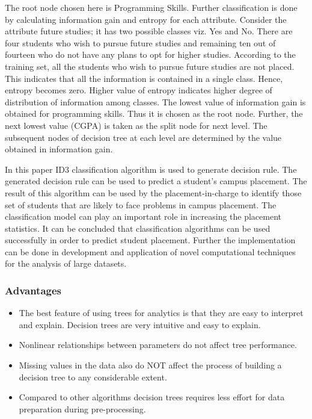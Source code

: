 \documentclass[12pt]{article}
\begin{document}
The root node chosen here is Programming Skills. 
Further classification is done by calculating information 
gain and entropy for each attribute. Consider the attribute future studies; it has two possible 
classes viz. Yes and No. There are four students who wish 
to pursue future studies and remaining ten out of fourteen 
who do not have any plans to opt for higher studies. 
According to the training set, all the students who wish to 
pursue future studies are not placed. This indicates that all 
the information is contained in a single class. Hence, 
entropy becomes zero. Higher value of entropy indicates 
higher degree of distribution of information among classes. 
The lowest value of information gain is obtained for 
programming skills. Thus it is chosen as the root node. 
Further, the next lowest value (CGPA) is taken as the split 
node for next level. The subsequent nodes of decision tree 
at each level are determined by the value obtained in 
information gain.

In this paper ID3 classification algorithm is used to 
generate decision rule. The generated decision rule can be 
used to predict a student’s campus placement. The result of 
this algorithm can be used by the placement-in-charge to 
identify those set of students that are likely to face 
problems in campus placement. The classification model 
can play an important role in increasing the placement 
statistics. It can be concluded that classification algorithms 
can be used successfully in order to predict student 
placement. Further the implementation can be done in 
development and application of novel computational 
techniques for the analysis of large datasets.
\newpage
\subsubsection{Advantages}
\begin{itemize}
\item The best feature of using trees for analytics is that they are easy to interpret and explain. Decision trees are very intuitive and easy to explain.
\item  Nonlinear relationships between parameters do not affect tree performance.
\item Missing values in the data also do NOT affect the process of building a decision tree to any considerable extent. 
\item Compared to other algorithms decision trees requires less effort for data preparation during pre-processing.
\end{itemize}
\vspace{10px}
\end{document}
